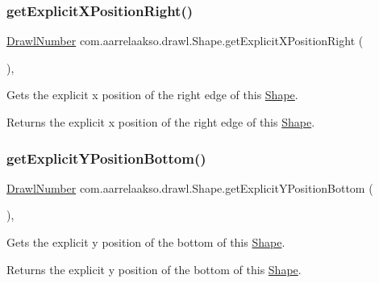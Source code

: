 \subsubsection{\texorpdfstring{get\+Explicit\+X\+Position\+Right()}{getExplicitXPositionRight()}}
{\footnotesize\ttfamily \hyperlink{classcom_1_1aarrelaakso_1_1drawl_1_1_drawl_number}{Drawl\+Number} com.\+aarrelaakso.\+drawl.\+Shape.\+get\+Explicit\+X\+Position\+Right (\begin{DoxyParamCaption}{ }\end{DoxyParamCaption})\hspace{0.3cm}{\ttfamily [protected]}, {\ttfamily [inherited]}}



Gets the explicit x position of the right edge of this \hyperlink{classcom_1_1aarrelaakso_1_1drawl_1_1_shape}{Shape}. 

\begin{DoxyReturn}{Returns}
the explicit x position of the right edge of this \hyperlink{classcom_1_1aarrelaakso_1_1drawl_1_1_shape}{Shape}. 
\end{DoxyReturn}
\mbox{\label{classcom_1_1aarrelaakso_1_1drawl_1_1_shape_aa26eb0263851ed8f8221bf3740e6e584}} 
\subsubsection{\texorpdfstring{get\+Explicit\+Y\+Position\+Bottom()}{getExplicitYPositionBottom()}}
{\footnotesize\ttfamily \hyperlink{classcom_1_1aarrelaakso_1_1drawl_1_1_drawl_number}{Drawl\+Number} com.\+aarrelaakso.\+drawl.\+Shape.\+get\+Explicit\+Y\+Position\+Bottom (\begin{DoxyParamCaption}{ }\end{DoxyParamCaption})\hspace{0.3cm}{\ttfamily [protected]}, {\ttfamily [inherited]}}



Gets the explicit y position of the bottom of this \hyperlink{classcom_1_1aarrelaakso_1_1drawl_1_1_shape}{Shape}. 

\begin{DoxyReturn}{Returns}
the explicit y position of the bottom of this \hyperlink{classcom_1_1aarrelaakso_1_1drawl_1_1_shape}{Shape}. 
\end{DoxyReturn}
\mbox{\label{classcom_1_1aarrelaakso_1_1drawl_1_1_shape_a602cb73f783f2856fa81e82bf7792263}} 
